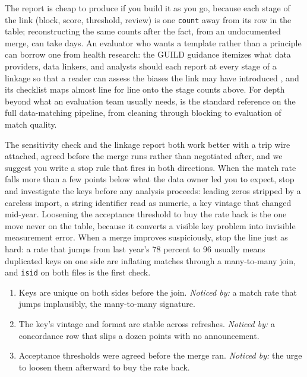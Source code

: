 The report is cheap to produce if you build it as you go, because each stage of the link (block, score, threshold, review) is one \texttt{count} away from its row in the table; reconstructing the same counts after the fact, from an undocumented merge, can take days. An evaluator who wants a template rather than a principle can borrow one from health research: the GUILD guidance itemizes what data providers, data linkers, and analysts should each report at every stage of a linkage so that a reader can assess the biases the link may have introduced \parencite{gilbert2018guild}, and its checklist maps almost line for line onto the stage counts above. For depth beyond what an evaluation team usually needs, \textcite{christen2012matching} is the standard reference on the full data-matching pipeline, from cleaning through blocking to evaluation of match quality.

The sensitivity check and the linkage report both work better with a trip wire attached, agreed before the merge runs rather than negotiated after, and we suggest you write a stop rule that fires in both directions. When the match rate falls more than a few points below what the data owner led you to expect, stop and investigate the keys before any analysis proceeds: leading zeros stripped by a careless import, a string identifier read as numeric, a key vintage that changed mid-year. Loosening the acceptance threshold to buy the rate back is the one move never on the table, because it converts a visible key problem into invisible measurement error. When a merge improves suspiciously, stop the line just as hard: a rate that jumps from last year's 78 percent to 96 usually means duplicated keys on one side are inflating matches through a many-to-many join, and \texttt{isid} on both files is the first check.

\begin{restson}
\begin{enumerate}
\item Keys are unique on both sides before the join. \emph{Noticed by:} a match rate that jumps implausibly, the many-to-many signature.
\item The key's vintage and format are stable across refreshes. \emph{Noticed by:} a concordance row that slips a dozen points with no announcement.
\item Acceptance thresholds were agreed before the merge ran. \emph{Noticed by:} the urge to loosen them afterward to buy the rate back.
\end{enumerate}
\end{restson}

